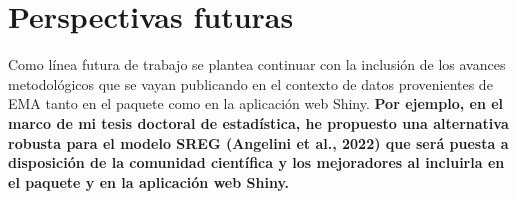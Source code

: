 \chapter*{Perspectivas futuras}


Como línea futura de trabajo se plantea continuar con la inclusión de los avances metodológicos que se vayan publicando en el contexto de datos provenientes de EMA tanto en el paquete como en la aplicación web Shiny. \textbf{Por ejemplo, en el marco de mi tesis doctoral de estadística, he propuesto una alternativa robusta para el modelo SREG (Angelini et al., 2022) que será puesta a disposición de la comunidad científica y los mejoradores al incluirla en el paquete y en la aplicación web Shiny.}




